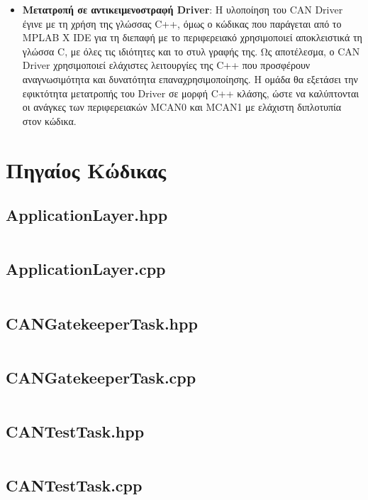 \documentclass[a4paper,nobib,justified]{tufte-book}
\begin{document}
\begin{itemize}
	\item \textbf{Μετατροπή σε αντικειμενοστραφή Driver}: Η υλοποίηση του CAN Driver έγινε με τη χρήση της γλώσσας C++, όμως ο κώδικας που παράγεται από το MPLAB X IDE για τη διεπαφή με το περιφερειακό χρησιμοποιεί αποκλειστικά τη γλώσσα C, με όλες τις ιδιότητες και το στυλ γραφής της. Ως αποτέλεσμα, ο CAN Driver χρησιμοποιεί ελάχιστες λειτουργίες της C++ που προσφέρουν αναγνωσιμότητα και δυνατότητα επαναχρησιμοποίησης. Η ομάδα θα εξετάσει την εφικτότητα μετατροπής του Driver σε μορφή C++ κλάσης, ώστε να καλύπτονται οι ανάγκες των περιφερειακών MCAN0 και MCAN1 με ελάχιστη διπλοτυπία στον κώδικα.
\end{itemize}

\appendix

\begin{fullwidth}
\bgroup
\egroup
\end{fullwidth}

\chapter{Πηγαίος Κώδικας}

\section*{ApplicationLayer.hpp}
\inputminted{cpp}{code/full-files/ApplicationLayer.hpp}
\newpage
\section*{ApplicationLayer.cpp}
\inputminted{cpp}{code/full-files/ApplicationLayer.cpp}
\newpage
\section*{CANGatekeeperTask.hpp}
\inputminted{cpp}{code/full-files/CANGatekeeperTask.hpp}
\newpage
\section*{CANGatekeeperTask.cpp}
\inputminted{cpp}{code/full-files/CANGatekeeperTask.cpp}
\newpage
\section*{CANTestTask.hpp}
\inputminted{cpp}{code/full-files/CANTestTask.hpp}
\newpage
\section*{CANTestTask.cpp}
\inputminted{cpp}{code/full-files/CANTestTask.cpp}
\newpage
\end{document}
